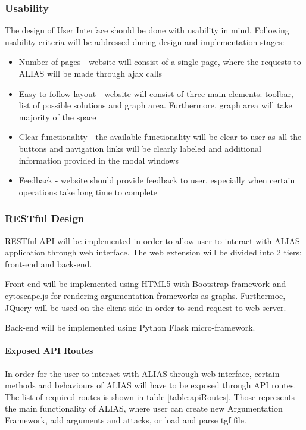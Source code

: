 \subsubsection{Usability}
The design of User Interface should be done with usability in mind. Following usability criteria will be addressed during design and implementation stages:
\begin{itemize}
	\item Number of pages - website will consist of a single page, where the requests to ALIAS will be made through ajax calls
	\item Easy to follow layout - website will consist of three main elements: toolbar, list of possible solutions and graph area. Furthermore, graph area will take majority of the space
	\item Clear functionality - the available functionality will be clear to user as all the buttons and navigation links will be clearly labeled and additional information provided in the modal windows
	\item Feedback - website should provide feedback to user, especially when certain operations take long time to complete
\end{itemize}

\subsubsection{RESTful Design}
RESTful API will be implemented in order to allow user to interact with ALIAS application through web interface. The web extension will be divided into 2 tiers: front-end and back-end. 

Front-end will be implemented using HTML5 with Bootstrap framework and cytoscape.js \citep{cytoscapejs} for rendering argumentation frameworks as graphs. Furthermoe, JQuery will be used on the client side in order to send request to web server.

Back-end will be implemented using Python Flask \citep{flaskDocs} micro-framework.

\paragraph{Exposed API Routes} 
In order for the user to interact with ALIAS through web interface, certain methods and behaviours of ALIAS will have to be exposed through API routes. The list of required routes is shown in table \ref{table:apiRoutes}. Those represents the main functionality of ALIAS, where user can create new Argumentation Framework, add arguments and attacks, or load and parse tgf file.


